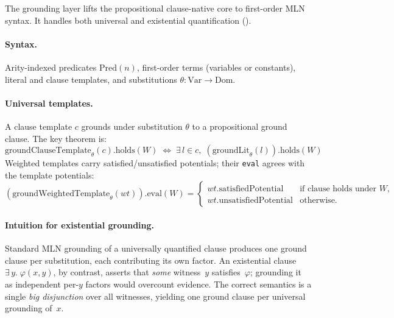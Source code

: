 \documentclass[11pt,openany]{report}
\begin{document}
The grounding layer lifts the propositional clause-native core to
first-order MLN syntax.  It handles both universal and existential
quantification ().

\paragraph{Syntax.}
Arity-indexed predicates $\mathrm{Pred}(n)$, first-order terms (variables
or constants), literal and clause templates, and substitutions $\theta :
\mathrm{Var} \to \mathrm{Dom}$.

\paragraph{Universal templates.}
A clause template $c$ grounds under substitution $\theta$ to a
propositional ground clause.  The key theorem is:
\[
  \mathrm{groundClauseTemplate}_\theta(c).\mathrm{holds}(W)
  \;\Longleftrightarrow\;
  \exists\, l \in c,\; (\mathrm{groundLit}_\theta(l)).\mathrm{holds}(W)
\]
Weighted templates carry satisfied/unsatisfied potentials; their
\texttt{eval} agrees with the template potentials:
\[
  (\mathrm{groundWeightedTemplate}_\theta(\mathit{wt})).\mathrm{eval}(W)
  = \begin{cases}
    \mathit{wt}.\mathrm{satisfiedPotential}
      & \text{if clause holds under } W, \\
    \mathit{wt}.\mathrm{unsatisfiedPotential}
      & \text{otherwise.}
  \end{cases}
\]

\paragraph{Intuition for existential grounding.}
Standard MLN grounding of a universally quantified clause produces one
ground clause per substitution, each contributing its own factor.  An
existential clause $\exists\, y.\;\varphi(x,y)$, by contrast, asserts
that \emph{some} witness~$y$ satisfies~$\varphi$; grounding it as
independent per-$y$ factors would overcount evidence.  The correct
semantics is a single \emph{big disjunction} over all witnesses,
yielding one ground clause per universal grounding of~$x$.
\end{document}
